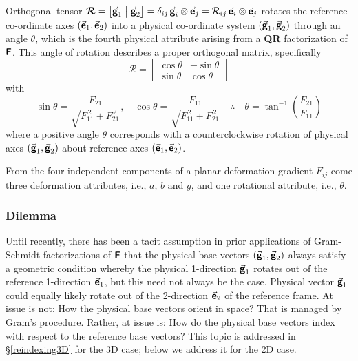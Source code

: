 Orthogonal tensor $\boldsymbol{\mathcal{R}} = \bigl[ \vec{\boldsymbol{\mathsf{g}}}_1 \bigm| \vec{\boldsymbol{\mathsf{g}}}_2 \bigr] = \delta_{ij} \, \vec{\boldsymbol{\mathsf{g}}}_i \otimes \vec{\boldsymbol{\mathsf{e}}}_j = \mathcal{R}_{ij} \, \vec{\boldsymbol{\mathsf{e}}}_i \otimes \vec{\boldsymbol{\mathsf{e}}}_j$ rotates the reference co-ordinate axes $( \vec{\boldsymbol{\mathsf{e}}}_1 , \vec{\boldsymbol{\mathsf{e}}}_2 )$ into a physical co-ordinate system $( \vec{\boldsymbol{\mathsf{g}}}_1 , \vec{\boldsymbol{\mathsf{g}}}_2 )$ through an angle $\theta$, which is the fourth physical attribute arising from a \textbf{QR} factorization of $\boldsymbol{\mathsf{F}}$.  This angle of rotation describes a proper orthogonal matrix, specifically
\begin{equation}
\boldsymbol{\mathcal{R}} = \begin{bmatrix}
\cos \theta & -\sin \theta \\
\sin \theta & \cos \theta
\end{bmatrix} 
\label{rotation}
\end{equation}  
with
\begin{equation}
\sin \theta = \frac{F_{21}}
{\sqrt{F_{11}^{\,2} + F_{21}^{\,2}}} , \quad
\cos \theta = \frac{F_{11}}
{\sqrt{F_{11}^{\,2} + F_{21}^{\,2}}} 
\quad \therefore \quad
\theta = \tan^{-1} \left( \frac{F_{21}}{F_{11}} \right)
\label{trigFns}
\end{equation}  
where a positive angle $\theta$ corresponds with a counter\-clockwise rotation of physical axes $( \vec{\boldsymbol{\mathsf{g}}}_1 , \vec{\boldsymbol{\mathsf{g}}}_2 )$ about reference axes $( \vec{\boldsymbol{\mathsf{e}}}_1 , \vec{\boldsymbol{\mathsf{e}}}_2 )$.  

From the four independent components of a planar deformation gradient $F_{ij}$ come three deformation attributes, i.e., $a$, $b$ and $g$, and one rotational attribute, i.e., $\theta$.


\subsubsection{Dilemma}
\label{secDilemma} 

Until recently, there has been a tacit assumption in prior applications of Gram-Schmidt factorizations of $\boldsymbol{\mathsf{F}}$ that the physical base vectors $( \vec{\boldsymbol{\mathsf{g}}}_1 , \vec{\boldsymbol{\mathsf{g}}}_2 )$ always satisfy a geometric condition whereby the physical 1-direction $\vec{\boldsymbol{\mathsf{g}}}_1$ rotates out of the reference 1-direction $\vec{\boldsymbol{\mathsf{e}}}_1$, but this need not always be the case.  Physical vector $\vec{\boldsymbol{\mathsf{g}}}_1$ could equally likely rotate out of the 2-direction $\vec{\boldsymbol{\mathsf{e}}}_2$ of the reference frame.  At issue is not: How the physical base vectors orient in space?  That is managed by Gram's procedure.  Rather, at issue is: How do the physical base vectors index with respect to the reference base vectors?  This topic is addressed in \S\ref{reindexing3D} for the 3D case; below we address it for the 2D case.

